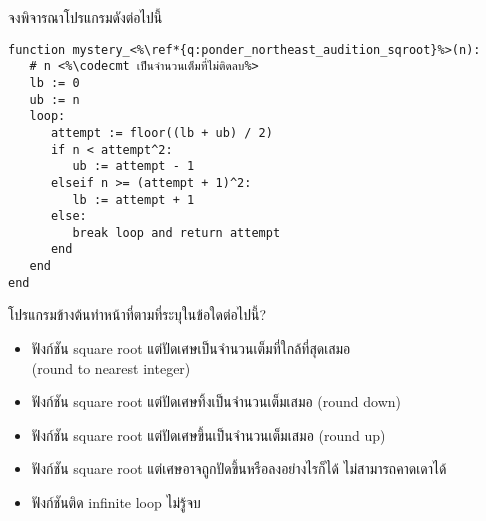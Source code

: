 \question{\label{q:ponder_northeast_audition_sqroot}}

จงพิจารณาโปรแกรมดังต่อไปนี้\,
\begin{lstlisting}
function mystery_<%\ref*{q:ponder_northeast_audition_sqroot}%>(n):
   # n <%\codecmt เป็นจำนวนเต็มที่ไม่ติดลบ%>
   lb := 0
   ub := n
   loop:
      attempt := floor((lb + ub) / 2)
      if n < attempt^2:
         ub := attempt - 1
      elseif n >= (attempt + 1)^2:
         lb := attempt + 1
      else: 
         break loop and return attempt
      end
   end
end
\end{lstlisting}
โปรแกรมข้างต้นทำหน้าที่ตามที่ระบุในข้อใดต่อไปนี้?

\begin{itemize}[label={$\Circle$}]
\item ฟังก์ชัน square root แต่ปัดเศษเป็นจำนวนเต็มที่ใกล้ที่สุดเสมอ\\ (round to nearest integer)
\item ฟังก์ชัน square root แต่ปัดเศษทิ้งเป็นจำนวนเต็มเสมอ (round down)
\item ฟังก์ชัน square root แต่ปัดเศษขึ้นเป็นจำนวนเต็มเสมอ (round up)
\item ฟังก์ชัน square root แต่เศษอาจถูกปัดขึ้นหรือลงอย่างไรก็ได้ ไม่สามารถคาดเดาได้
\item ฟังก์ชันติด infinite loop ไม่รู้จบ
\end{itemize}
